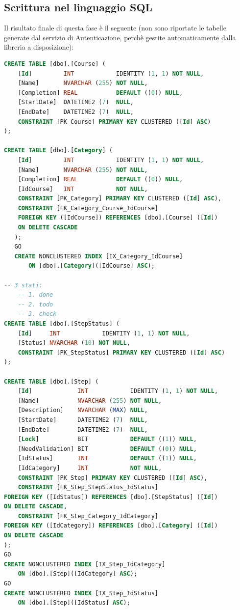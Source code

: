 \subsection{Scrittura nel linguaggio SQL}
Il risultato finale di questa fase è il seguente (non sono riportate le tabelle
generate dal servizio di Autenticazione, perchè gestite automaticamente dalla
libreria a disposizione):
\begin{lstlisting}[language=SQL, caption=traduzione della progettazione del database nel linguaggio SQL]
CREATE TABLE [dbo].[Course] ( 
    [Id]         INT            IDENTITY (1, 1) NOT NULL, 
    [Name]       NVARCHAR (255) NOT NULL, 
    [Completion] REAL           DEFAULT ((0)) NULL, 
    [StartDate]  DATETIME2 (7)  NULL, 
    [EndDate]    DATETIME2 (7)  NULL, 
    CONSTRAINT [PK_Course] PRIMARY KEY CLUSTERED ([Id] ASC) 
); 

CREATE TABLE [dbo].[Category] ( 
    [Id]         INT            IDENTITY (1, 1) NOT NULL, 
    [Name]       NVARCHAR (255) NOT NULL, 
    [Completion] REAL           DEFAULT ((0)) NULL, 
    [IdCourse]   INT            NOT NULL, 
    CONSTRAINT [PK_Category] PRIMARY KEY CLUSTERED ([Id] ASC), 
    CONSTRAINT [FK_Category_Course_IdCourse]
	FOREIGN KEY ([IdCourse]) REFERENCES [dbo].[Course] ([Id]) 
	ON DELETE CASCADE 
   ); 
   GO 
   CREATE NONCLUSTERED INDEX [IX_Category_IdCourse] 
	   ON [dbo].[Category]([IdCourse] ASC); 	

-- 3 stati: 
	-- 1. done 
	-- 2. todo 
	-- 3. check 
CREATE TABLE [dbo].[StepStatus] ( 
	[Id]     INT            IDENTITY (1, 1) NOT NULL, 
	[Status] NVARCHAR (10) NOT NULL, 
	CONSTRAINT [PK_StepStatus] PRIMARY KEY CLUSTERED ([Id] ASC) 
); 
	
CREATE TABLE [dbo].[Step] ( 
	[Id]             INT            IDENTITY (1, 1) NOT NULL, 
	[Name]           NVARCHAR (255) NOT NULL, 
	[Description]    NVARCHAR (MAX) NULL, 
	[StartDate]      DATETIME2 (7)  NULL, 
	[EndDate]        DATETIME2 (7)  NULL, 
	[Lock]           BIT            DEFAULT ((1)) NULL, 
	[NeedValidation] BIT            DEFAULT ((0)) NULL, 
	[IdStatus]       INT            DEFAULT ((1)) NULL, 
	[IdCategory]     INT            NOT NULL, 
	CONSTRAINT [PK_Step] PRIMARY KEY CLUSTERED ([Id] ASC), 
	CONSTRAINT [FK_Step_StepStatus_IdStatus]  
FOREIGN KEY ([IdStatus]) REFERENCES [dbo].[StepStatus] ([Id]) 
ON DELETE CASCADE, 
	CONSTRAINT [FK_Step_Category_IdCategory]  
FOREIGN KEY ([IdCategory]) REFERENCES [dbo].[Category] ([Id]) 
ON DELETE CASCADE 
); 
GO 
CREATE NONCLUSTERED INDEX [IX_Step_IdCategory] 
	ON [dbo].[Step]([IdCategory] ASC); 
GO 
CREATE NONCLUSTERED INDEX [IX_Step_IdStatus] 
	ON [dbo].[Step]([IdStatus] ASC); 


\end{lstlisting}
